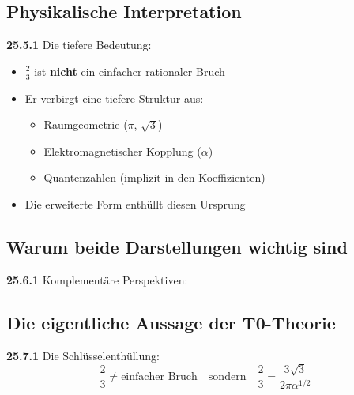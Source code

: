 \subsection{Physikalische Interpretation}

\noindent \textbf{25.5.1} Die tiefere Bedeutung:
\begin{itemize}
	\item $\frac{2}{3}$ ist \textbf{nicht} ein einfacher rationaler Bruch
	\item Er verbirgt eine tiefere Struktur aus:
	\begin{itemize}
		\item Raumgeometrie ($\pi$, $\sqrt{3}$)
		\item Elektromagnetischer Kopplung ($\alpha$)
		\item Quantenzahlen (implizit in den Koeffizienten)
	\end{itemize}
	\item Die erweiterte Form enthüllt diesen Ursprung
\end{itemize}

\subsection{Warum beide Darstellungen wichtig sind}

\noindent \textbf{25.6.1} Komplementäre Perspektiven:


\subsection{Die eigentliche Aussage der T0-Theorie}

\noindent \textbf{25.7.1} Die Schlüsselenthüllung:
\[
\boxed{
	\frac{2}{3} \neq \text{einfacher Bruch} \quad \text{sondern} \quad \frac{2}{3} = \frac{3\sqrt{3}}{2\pi\alpha^{1/2}}
}
\]

